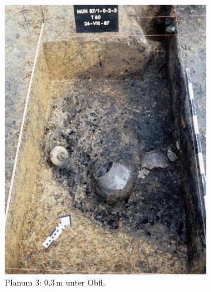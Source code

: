 \begin{figure}[p]
\begin{subfigure}[t]{0.32\textwidth}
		\includegraphics[width = \textwidth]{fig/MUN87-102_Pl3_E87-040-36.jpg}
		\caption{Planum 3: 0,3\,m unter Obfl.}
		\label{fig:MUN87-1-0-2_Pl_3}
	\end{subfigure}\hfill
	\begin{subfigure}[t]{0.32\textwidth}
		\centering

\end{subfigure}
\end{figure}
